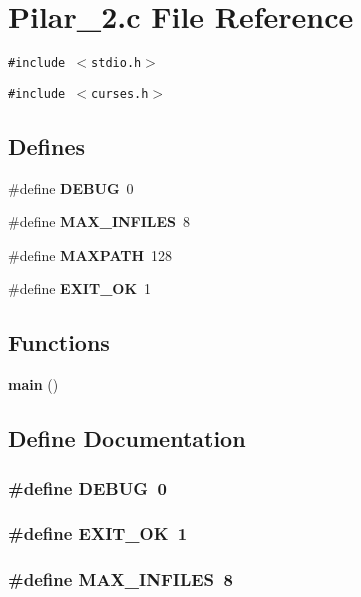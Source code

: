 \section{Pilar\_\-2.c File Reference}
\label{Pilar__2_8c}
{\tt \#include $<$stdio.h$>$}\par
{\tt \#include $<$curses.h$>$}\par
\subsection*{Defines}
\begin{CompactItemize}
\item 
\#define {\bf DEBUG}\ 0
\item 
\#define {\bf MAX\_\-INFILES}\ 8
\item 
\#define {\bf MAXPATH}\ 128
\item 
\#define {\bf EXIT\_\-OK}\ 1
\end{CompactItemize}
\subsection*{Functions}
\begin{CompactItemize}
\item 
{\bf main} ()
\end{CompactItemize}


\subsection{Define Documentation}
\subsubsection{\setlength{\rightskip}{0pt plus 5cm}\#define DEBUG\ 0}\label{Pilar__2_8c_a0}


\subsubsection{\setlength{\rightskip}{0pt plus 5cm}\#define EXIT\_\-OK\ 1}\label{Pilar__2_8c_a3}


\subsubsection{\setlength{\rightskip}{0pt plus 5cm}\#define MAX\_\-INFILES\ 8}\label{Pilar__2_8c_a1}


